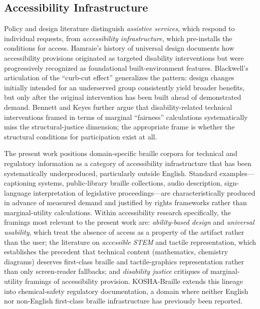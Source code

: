 \documentclass[journal]{IEEEtran}
\begin{document}
\subsection{Accessibility Infrastructure}

Policy and design literature distinguish \emph{assistive services}, which respond to individual requests, from \emph{accessibility infrastructure}, which pre-installs the conditions for access. Hamraie's history of universal design \cite{hamraie} documents how accessibility provisions originated as targeted disability interventions but were progressively recognized as foundational built-environment features. Blackwell's articulation of the ``curb-cut effect'' \cite{curb_cut} generalizes the pattern: design changes initially intended for an underserved group consistently yield broader benefits, but only after the original intervention has been built ahead of demonstrated demand. Bennett and Keyes \cite{bennett_keyes} further argue that disability-related technical interventions framed in terms of marginal ``fairness'' calculations systematically miss the structural-justice dimension; the appropriate frame is whether the structural conditions for participation exist at all.

The present work positions domain-specific braille corpora for technical and regulatory information as a category of accessibility infrastructure that has been systematically underproduced, particularly outside English. Standard examples---captioning systems, public-library braille collections, audio description, sign-language interpretation of legislative proceedings---are characteristically produced in advance of measured demand and justified by rights frameworks rather than marginal-utility calculations. Within accessibility research specifically, the framings most relevant to the present work are: \emph{ability-based design} and \emph{universal usability}, which treat the absence of access as a property of the artifact rather than the user; the literature on \emph{accessible STEM} and tactile representation, which establishes the precedent that technical content (mathematics, chemistry diagrams) deserves first-class braille and tactile-graphics representation rather than only screen-reader fallbacks; and \emph{disability justice} critiques of marginal-utility framings of accessibility provision. KOSHA-Braille extends this lineage into chemical-safety regulatory documentation, a domain where neither English nor non-English first-class braille infrastructure has previously been reported.
\end{document}
